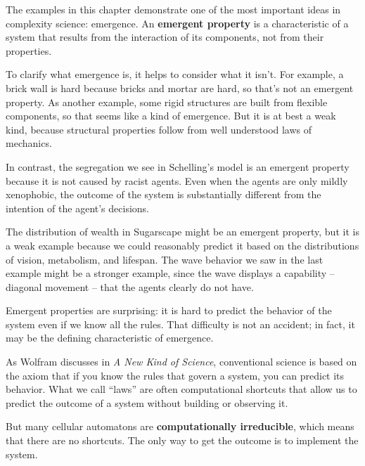 \documentclass[12pt]{book}
\theoremstyle{exercise}
\begin{document}
The examples in this chapter demonstrate one of the most important
ideas in complexity science: emergence.  An {\bf emergent property} is
a characteristic of a system that results from the interaction of its
components, not from their properties.


To clarify what emergence is, it helps to consider what it isn't.  For
example, a brick wall is hard because bricks and mortar are hard, so
that's not an emergent property.  As another example, some rigid
structures are built from flexible components, so that seems like a
kind of emergence.  But it is at best a weak kind, because structural
properties follow from well understood laws of mechanics.


In contrast, the segregation we see in Schelling's model is an emergent
property because it is not caused by racist agents.  Even when the
agents are only mildly xenophobic, the outcome of the system is
substantially different from the intention of the agent's decisions.

The distribution of wealth in Sugarscape might be an emergent
property, but it is a weak example because we could
reasonably predict it based on the distributions of vision, metabolism,
and lifespan.  The wave behavior we saw in the last example might
be a stronger example, since the wave displays a capability -- diagonal
movement -- that the agents clearly do not have. 

Emergent properties are surprising: it is hard to predict the behavior
of the system even if we know all the rules.  That difficulty is not
an accident; in fact, it may be the defining characteristic of emergence.

As Wolfram discusses in {\em A New Kind of Science}, conventional science
is based on the axiom that if you know the rules that govern a system,
you can predict its behavior.  What we call ``laws'' are often
computational shortcuts that allow us to predict the outcome of a
system without building or observing it.


But many cellular automatons are {\bf computationally irreducible},
which means that there are no shortcuts.  The only way to get the
outcome is to implement the system.

\end{document}
